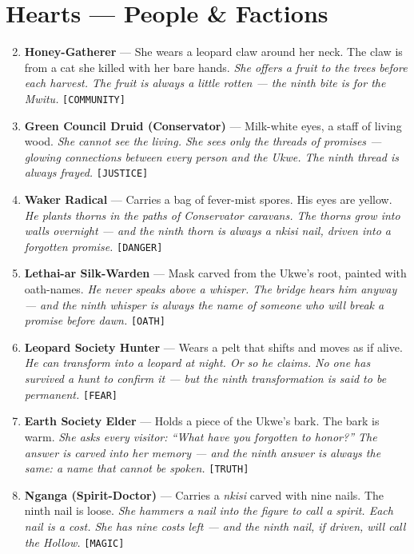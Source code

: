 \section*{Hearts --- People \& Factions}
\label{sec:sekogo-people}
\begin{enumerate}
\setcounter{enumi}{1}
\item \textbf{Honey-Gatherer} --- She wears a leopard claw around her neck. The claw is from a cat she killed with her bare hands.
  \hfill \textit{She offers a fruit to the trees before each harvest. The fruit is always a little rotten --- the ninth bite is for the \textit{Mwitu}.} \texttt{[COMMUNITY]}
\item \textbf{Green Council Druid (Conservator)} --- Milk-white eyes, a staff of living wood.
  \hfill \textit{She cannot see the living. She sees only the threads of promises --- glowing connections between every person and the Ukwe. The ninth thread is always frayed.} \texttt{[JUSTICE]}
\item \textbf{Waker Radical} --- Carries a bag of fever-mist spores. His eyes are yellow.
  \hfill \textit{He plants thorns in the paths of Conservator caravans. The thorns grow into walls overnight --- and the ninth thorn is always a \textit{nkisi} nail, driven into a forgotten promise.} \texttt{[DANGER]}
\item \textbf{Lethai-ar Silk-Warden} --- Mask carved from the Ukwe's root, painted with oath-names.
  \hfill \textit{He never speaks above a whisper. The bridge hears him anyway --- and the ninth whisper is always the name of someone who will break a promise before dawn.} \texttt{[OATH]}
\item \textbf{Leopard Society Hunter} --- Wears a pelt that shifts and moves as if alive.
  \hfill \textit{He can transform into a leopard at night. Or so he claims. No one has survived a hunt to confirm it --- but the ninth transformation is said to be permanent.} \texttt{[FEAR]}
\item \textbf{Earth Society Elder} --- Holds a piece of the Ukwe's bark. The bark is warm.
  \hfill \textit{She asks every visitor: ``What have you forgotten to honor?'' The answer is carved into her memory --- and the ninth answer is always the same: a name that cannot be spoken.} \texttt{[TRUTH]}
\item \textbf{Nganga (Spirit-Doctor)} --- Carries a \textit{nkisi} carved with nine nails. The ninth nail is loose.
  \hfill \textit{She hammers a nail into the figure to call a spirit. Each nail is a cost. She has nine costs left --- and the ninth nail, if driven, will call the Hollow.} \texttt{[MAGIC]}

\end{enumerate}
